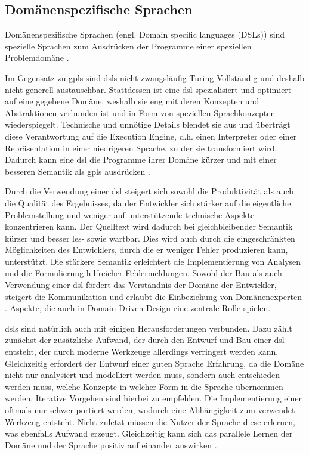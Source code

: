 \subsection{Domänenspezifische Sprachen}
    Domänenspezifische Sprachen (engl. Domain specific languages (DSLs))
    sind spezielle Sprachen zum Ausdrücken der Programme einer speziellen
    Problemdomäne \cite[Kapitel 2.2]{voelter:DslEngineering}.

    Im Gegensatz zu \glspl{gpl} sind \glspl{dsl} nicht zwangsläufig Turing-Vollständig
    und deshalb nicht generell austauschbar.
    Stattdessen ist eine \gls{dsl} spezialisiert und optimiert auf eine gegebene Domäne,
    weshalb sie eng mit deren Konzepten und Abstraktionen verbunden ist
    und in Form von speziellen Sprachkonzepten wiederspiegelt.
    Technische und unnötige Details blendet sie aus und überträgt diese Verantwortung
    auf die Execution Engine, d.h. einen Interpreter oder einer Repräsentation in einer
    niedrigeren Sprache, zu der sie transformiert wird.
    Dadurch kann eine \gls{dsl} die Programme ihrer Domäne kürzer und mit einer besseren Semantik
    als \glspl{gpl} ausdrücken \cite[Kapitel 2.2]{voelter:DslEngineering}.

    Durch die Verwendung einer \gls{dsl} steigert sich sowohl die Produktivität
    als auch die Qualität des Ergebnisses,
    da der Entwickler sich stärker auf die eigentliche Problemstellung und weniger
    auf unterstützende technische Aspekte konzentrieren kann.
    Der Quelltext wird dadurch bei gleichbleibender Semantik kürzer und besser les- sowie wartbar.
    Dies wird auch durch die eingeschränkten Möglichkeiten des Entwicklers,
    durch die er weniger Fehler produzieren kann, unterstützt.
    Die stärkere Semantik erleichtert die Implementierung von Analysen und die Formulierung
    hilfreicher Fehlermeldungen.
    Sowohl der Bau als auch Verwendung einer \gls{dsl} fördert das Verständnis der Domäne
    der Entwickler, steigert die Kommunikation und erlaubt die Einbeziehung von Domänenexperten
    \cite[Kapitel 2.5]{voelter:DslEngineering}.
    Aspekte, die auch in \citet{evans:DomainDrivenDesign} Domain Driven Design eine zentrale Rolle spielen.


    \glspl{dsl} sind natürlich auch mit einigen Herausforderungen verbunden.
    Dazu zählt zunächst der zusätzliche Aufwand, der durch den Entwurf und Bau einer \gls{dsl} entsteht,
    der durch moderne Werkzeuge allerdings verringert werden kann.
    Gleichzeitig erfordert der Entwurf einer guten Sprache Erfahrung,
    da die Domäne nicht nur analysiert und modelliert werden muss,
    sondern auch entschieden werden muss, welche Konzepte in welcher Form in die Sprache übernommen werden.
    Iterative Vorgehen sind hierbei zu empfehlen.
    Die Implementierung einer oftmals nur schwer portiert werden,
    wodurch eine Abhängigkeit zum verwendet Werkzeug entsteht.
    Nicht zuletzt müssen die Nutzer der Sprache diese erlernen,
    was ebenfalls Aufwand erzeugt.
    Gleichzeitig kann sich das parallele Lernen der Domäne und der Sprache positiv auf einander auswirken
    \cite[Kapitel 2.6]{voelter:DslEngineering}.

